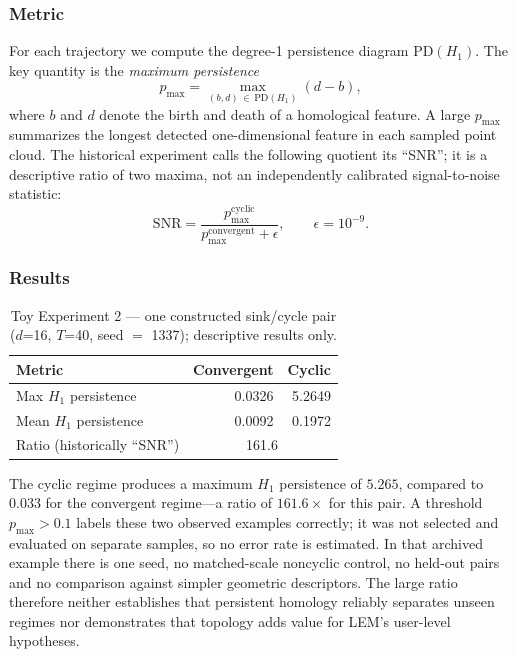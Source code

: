 \documentclass[11pt]{article}
\begin{document}
\subsubsection{Metric}

For each trajectory we compute the degree-1 persistence diagram $\mathrm{PD}(H_1)$.
The key quantity is the \emph{maximum persistence}
\[
  p_{\max} = \max_{(b,d)\, \in\, \mathrm{PD}(H_1)} (d - b),
\]
where $b$ and $d$ denote the birth and death of a homological feature. A large
$p_{\max}$ summarizes the longest detected one-dimensional feature in each
sampled point cloud. The historical experiment calls the following quotient its
``SNR''; it is a descriptive ratio of two maxima, not an independently calibrated
signal-to-noise statistic:
\[
  \mathrm{SNR} = \frac{p^{\text{cyclic}}_{\max}}{p^{\text{convergent}}_{\max} + \epsilon},
  \qquad \epsilon = 10^{-9}.
\]

\subsubsection{Results}

\begin{table}[htbp]
  \centering
  \caption{Toy Experiment 2 --- one constructed sink/cycle pair ($d$=16,
           $T$=40, seed $=$ 1337); descriptive results only.}
  \label{tab:toy2}
  \begin{tabular}{lrr}
    \toprule
    \textbf{Metric} & \textbf{Convergent} & \textbf{Cyclic} \\
    \midrule
    Max $H_1$ persistence     & 0.0326 & 5.2649 \\
    Mean $H_1$ persistence    & 0.0092 & 0.1972 \\
    Ratio (historically ``SNR'') & \multicolumn{2}{c}{161.6} \\
    \bottomrule
  \end{tabular}
\end{table}

The cyclic regime produces a maximum $H_1$ persistence of $5.265$, compared to
$0.033$ for the convergent regime---a ratio of $161.6\times$ for this pair.
A threshold $p_{\max} > 0.1$ labels these two observed examples correctly; it was
not selected and evaluated on separate samples, so no error rate is estimated.
In that archived example there is one seed, no matched-scale noncyclic control,
no held-out pairs and no comparison against simpler geometric descriptors. The large ratio therefore
neither establishes that persistent homology reliably separates unseen regimes
nor demonstrates that topology adds value for LEM's user-level hypotheses.
\end{document}
